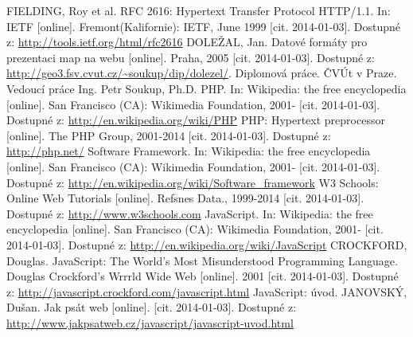 \documentclass[11pt,a4paper,titlepage,oneside]{book}
\begin{document}
\begin{thebibliography}{50}
	FIELDING, Roy et al. RFC 2616: Hypertext Transfer Protocol HTTP/1.1. In: IETF [online]. Fremont(Kalifornie): IETF, June 1999 [cit. 2014-01-03]. Dostupné z: \url{http://tools.ietf.org/html/rfc2616}
	DOLEŽAL, Jan. Datové formáty pro prezentaci map na webu [online]. Praha, 2005 [cit. 2014-01-03]. Dostupné z: \url{http://geo3.fsv.cvut.cz/~soukup/dip/dolezel/}. Diplomová práce. ČVÚt v Praze. Vedoucí práce Ing. Petr Soukup, Ph.D.
	PHP. In: Wikipedia: the free encyclopedia [online]. San Francisco (CA): Wikimedia Foundation, 2001- [cit. 2014-01-03]. Dostupné z: \url{http://en.wikipedia.org/wiki/PHP}
	PHP: Hypertext preprocessor [online]. The PHP Group, 2001-2014 [cit. 2014-01-03]. Dostupné z: \url{http://php.net/}
        Software Framework. In: Wikipedia: the free encyclopedia [online]. San Francisco (CA): Wikimedia Foundation, 2001- [cit. 2014-01-03]. Dostupné z: \url{http://en.wikipedia.org/wiki/Software_framework}
        W3 Schools: Online Web Tutorials [online]. Refsnes Data., 1999-2014 [cit. 2014-01-03]. Dostupné z: \url{http://www.w3schools.com}
       	JavaScript. In: Wikipedia: the free encyclopedia [online]. San Francisco (CA): Wikimedia Foundation, 2001- [cit. 2014-01-03]. Dostupné z: \url{http://en.wikipedia.org/wiki/JavaScript}
       	CROCKFORD, Douglas. JavaScript: The World's Most Misunderstood Programming Language. Douglas Crockford's Wrrrld Wide Web [online]. 2001 [cit. 2014-01-03]. Dostupné z: \url{http://javascript.crockford.com/javascript.html}
        JavaScript: úvod. JANOVSKÝ, Dušan. Jak psát web [online]. [cit. 2014-01-03]. Dostupné z: \url{http://www.jakpsatweb.cz/javascript/javascript-uvod.html}
\end{thebibliography}
\end{document}
